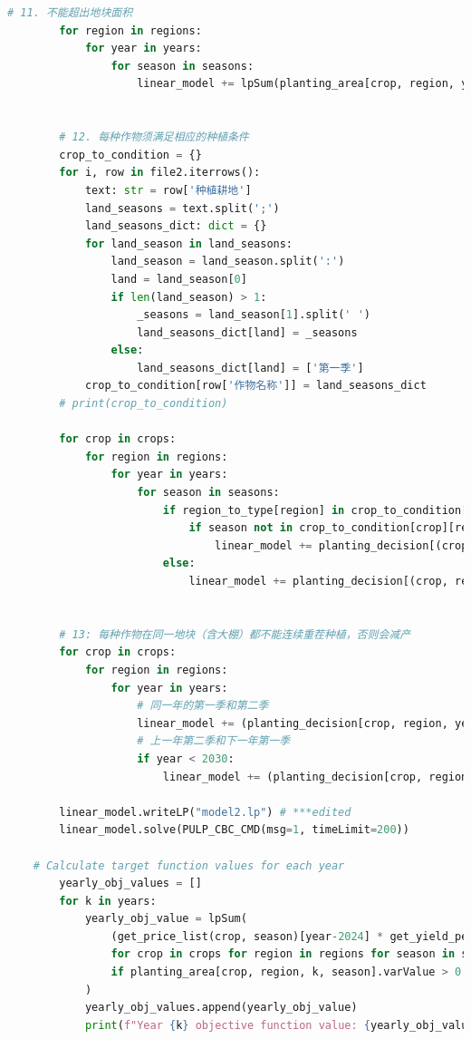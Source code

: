 \documentclass[withoutpreface]{cumcmthesis}
\begin{document}
\begin{appendices}
\begin{lstlisting}[language=python]
        # 11. 不能超出地块面积
        for region in regions:
            for year in years:
                for season in seasons:
                    linear_model += lpSum(planting_area[crop, region, year, season] for crop in crops) <= region_areas[region]
    
    
        # 12. 每种作物须满足相应的种植条件
        crop_to_condition = {}
        for i, row in file2.iterrows():
            text: str = row['种植耕地']
            land_seasons = text.split(';')
            land_seasons_dict: dict = {}
            for land_season in land_seasons:
                land_season = land_season.split(':')
                land = land_season[0]
                if len(land_season) > 1:
                    _seasons = land_season[1].split(' ')
                    land_seasons_dict[land] = _seasons
                else:
                    land_seasons_dict[land] = ['第一季']
            crop_to_condition[row['作物名称']] = land_seasons_dict
        # print(crop_to_condition)
    
        for crop in crops:
            for region in regions:
                for year in years:
                    for season in seasons:
                        if region_to_type[region] in crop_to_condition[crop]:
                            if season not in crop_to_condition[crop][region_to_type[region]]:
                                linear_model += planting_decision[(crop, region, year, season)] == 0
                        else:
                            linear_model += planting_decision[(crop, region, year, season)] == 0
                            
        
        # 13: 每种作物在同一地块（含大棚）都不能连续重茬种植，否则会减产
        for crop in crops:
            for region in regions:
                for year in years:
                    # 同一年的第一季和第二季
                    linear_model += (planting_decision[crop, region, year, '第一季'] + planting_decision[crop, region, year, '第二季'] <= 1)
                    # 上一年第二季和下一年第一季
                    if year < 2030:
                        linear_model += (planting_decision[crop, region, year, '第二季'] + planting_decision[crop, region, year+1, '第一季'] <= 1)
    
        linear_model.writeLP("model2.lp") # ***edited
        linear_model.solve(PULP_CBC_CMD(msg=1, timeLimit=200))
    
    # Calculate target function values for each year
        yearly_obj_values = []
        for k in years:
            yearly_obj_value = lpSum(
                (get_price_list(crop, season)[year-2024] * get_yield_per_acre_list(crop, region)[year-2024] - get_cost_list(crop, region)[year-2024]) * planting_area[crop, region, k, season].varValue
                for crop in crops for region in regions for season in seasons
                if planting_area[crop, region, k, season].varValue > 0  # Only consider variables with planting area greater than 0
            )
            yearly_obj_values.append(yearly_obj_value)
            print(f"Year {k} objective function value: {yearly_obj_value}")
    

\end{lstlisting}
\end{appendices}
\end{document}
